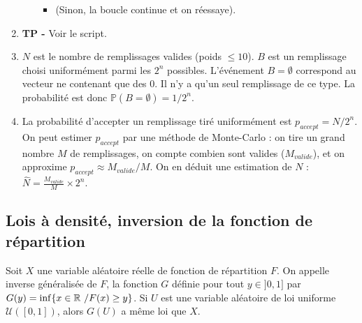 \documentclass[solutions]{exercices}
\begin{document}
\begin{solution}
\begin{enumerate}
\begin{itemize}
\begin{itemize}
          \item (Sinon, la boucle continue et on réessaye).
      \end{itemize}
  \end{itemize}
  \item \textbf{TP -} Voir le script.
  \item $N$ est le nombre de remplissages valides (poids $\le 10$). $B$ est un remplissage choisi uniformément parmi les $2^n$ possibles. L'événement $B=\emptyset$ correspond au vecteur ne contenant que des 0. Il n'y a qu'un seul remplissage de ce type. La probabilité est donc $\mathbb{P}(B = \emptyset) = 1/2^n$.
  \item La probabilité d'accepter un remplissage tiré uniformément est $p_{accept} = N / 2^n$. On peut estimer $p_{accept}$ par une méthode de Monte-Carlo : on tire un grand nombre $M$ de remplissages, on compte combien sont valides ($M_{valide}$), et on approxime $p_{accept} \approx M_{valide}/M$.
  On en déduit une estimation de $N$ : $\hat{N} = \frac{M_{valide}}{M} \times 2^n$.
\end{enumerate}
\end{solution}

\subsection*{Lois à densité, inversion de la fonction de répartition}

Soit $X$ une variable al\'eatoire r\'eelle de fonction de
r\'epartition $F$. On appelle inverse g\'en\'eralis\'ee de $F$, la
fonction $G$ d\'efinie pour tout $y\in ]0,1]$ par
$G(y)=\inf\{x\in \mathbb{R} \ / F(x)\geq y \}$.
Si $U$ est une variable al\'eatoire
de loi uniforme ${\mathcal U}([0,1])$, alors $G(U)$ a m\^eme loi que $X$.
\end{document}
